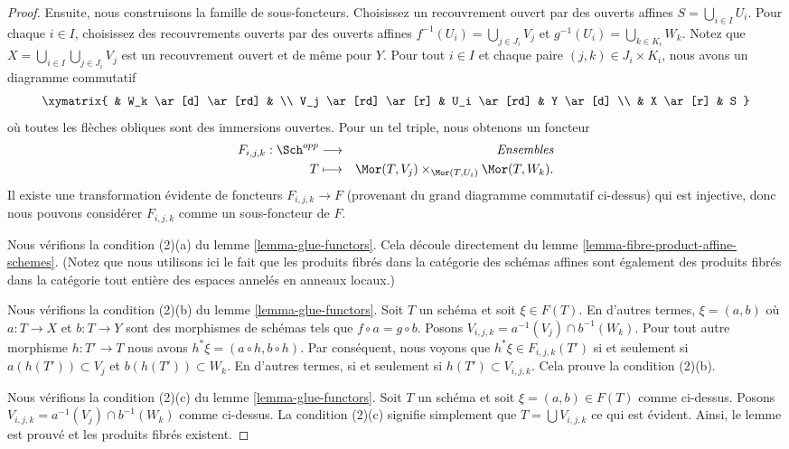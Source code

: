 \begin{proof}
\medskip\noindent
Ensuite, nous construisons la famille de sous-foncteurs.
Choisissez un recouvrement ouvert par des
ouverts affines $S = \bigcup\nolimits_{i \in
I} U_i$. Pour chaque $i \in I$, choisissez des recouvrements
ouverts par des ouverts affines $f^{-1}(U_i) = \bigcup\nolimits_{j
\in J_i} V_j$ et $g^{-1}(U_i) = \bigcup\nolimits_{k \in
K_i} W_k$. Notez que $X = \bigcup_{i \in I} \bigcup_{j \in J_i}
V_j$ est un recouvrement ouvert et de même pour
$Y$. Pour tout $i \in I$ et chaque paire $(j, k) \in J_i \times K_i$,
nous avons un diagramme commutatif
$$
\xymatrix{
& W_k \ar[d] \ar[rd] & \\ V_j
\ar[rd] \ar[r] & U_i \ar[rd] & Y \ar[d]
\\ & X \ar[r] & S
}
$$
où toutes les flèches obliques sont des immersions ouvertes. Pour un tel
triple, nous obtenons un foncteur
\begin{eqnarray*}
F_{i, j, k} : \Sch^{opp} & \longrightarrow & \textit{Ensembles}
\\ T & \longmapsto
& \Mor(T, V_j) \times_{\Mor(T, U_i)} \Mor(T, W_k).
\end{eqnarray*}
Il existe une transformation évidente de foncteurs $F_{i, j, k} \to F$
(provenant du grand diagramme commutatif ci-dessus) qui est
injective, donc nous pouvons considérer $F_{i, j, k}$ comme un sous-foncteur
de $F$.

\medskip\noindent
Nous vérifions la condition (2)(a) du lemme \ref{lemma-glue-functors}. Cela
découle directement du lemme \ref{lemma-fibre-product-affine-schemes}. (Notez que nous
utilisons ici le fait que les produits fibrés dans la catégorie des schémas affines
sont également des produits fibrés dans la catégorie tout entière des espaces annelés en
anneaux locaux.)

\medskip\noindent
Nous vérifions la condition (2)(b) du lemme \ref{lemma-glue-functors}.
Soit $T$ un schéma et soit $\xi \in F(T)$. En d'autres termes,
$\xi = (a, b)$ où $a : T \to X$ et $b : T \to Y$ sont des
morphismes de schémas tels que $f \circ a = g \circ b$. Posons
$V_{i, j, k} = a^{-1}(V_j) \cap b^{-1}(W_k)$. Pour tout autre
morphisme $h : T' \to T$ nous avons $h^*\xi
= (a \circ h, b \circ h)$. Par conséquent, nous voyons que
$h^*\xi \in F_{i, j, k}(T')$ si et seulement si
$a(h(T')) \subset V_j$ et $b(h(T')) \subset W_k$. En
d'autres termes, si et seulement si $h(T') \subset V_{i, j, k}$.
Cela prouve la condition (2)(b).

\medskip\noindent
Nous vérifions la condition (2)(c) du lemme \ref{lemma-glue-functors}.
Soit $T$ un schéma et soit $\xi = (a, b) \in F(T)$ comme ci-dessus. Posons
$V_{i, j, k} = a^{-1}(V_j) \cap b^{-1}(W_k)$ comme ci-dessus. La
condition (2)(c) signifie simplement que $T = \bigcup V_{i, j, k}$ ce
qui est évident. Ainsi, le lemme est prouvé et les produits fibrés
existent.
\end{proof}

